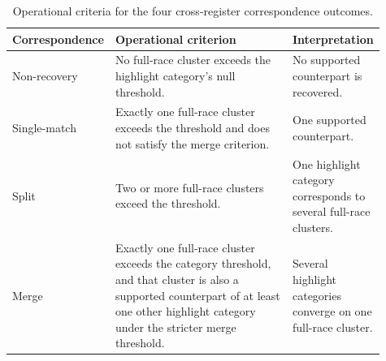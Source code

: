 \begin{table}[H]
\centering\rmfamily\footnotesize
\caption{Operational criteria for the four cross-register correspondence outcomes.}
\label{tab:corrclasses}
\setlength{\tabcolsep}{5pt}
\begin{tabular}{>{\raggedright\arraybackslash}p{0.097\linewidth}>{\raggedright\arraybackslash}p{0.606\linewidth}>{\raggedright\arraybackslash}p{0.211\linewidth}}
\toprule
Correspondence & Operational criterion & Interpretation \\
\midrule
Non-recovery & No full-race cluster exceeds the highlight category's null threshold. & No supported counterpart is recovered. \\
Single-match & Exactly one full-race cluster exceeds the threshold and does not satisfy the merge criterion. & One supported counterpart. \\
Split & Two or more full-race clusters exceed the threshold. & One highlight category corresponds to several full-race clusters. \\
Merge & Exactly one full-race cluster exceeds the category threshold, and that cluster is also a supported counterpart of at least one other highlight category under the stricter merge threshold. & Several highlight categories converge on one full-race cluster. \\
\bottomrule
\end{tabular}
\end{table}
